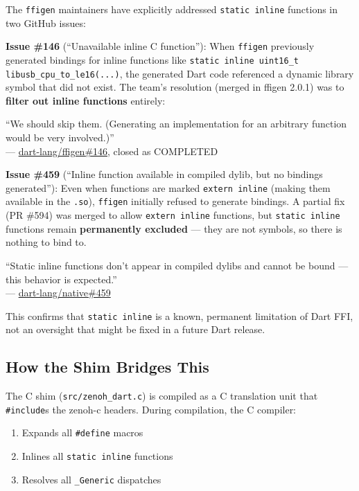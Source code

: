 \documentclass[11pt,a4paper]{article}
\newcommand{\code}[1]{\texttt{#1}}
\newcommand{\file}[1]{\texttt{#1}}
\begin{document}
The \code{ffigen} maintainers have explicitly addressed \code{static inline}
functions in two GitHub issues:

\textbf{Issue \#146} (``Unavailable inline C function''): When \code{ffigen}
previously generated bindings for inline functions like
\code{static inline uint16\_t libusb\_cpu\_to\_le16(...)}, the generated Dart
code referenced a dynamic library symbol that did not exist. The team's
resolution (merged in ffigen 2.0.1) was to \textbf{filter out inline functions}
entirely:

\begin{quotebox}
``We should skip them. (Generating an implementation for an arbitrary
function would be very involved.)''\\
--- \href{https://github.com/dart-lang/ffigen/issues/146}{dart-lang/ffigen\#146}, closed as COMPLETED
\end{quotebox}

\textbf{Issue \#459} (``Inline function available in compiled dylib, but no
bindings generated''): Even when functions are marked \code{extern inline}
(making them available in the \code{.so}), \code{ffigen} initially refused to
generate bindings. A partial fix (PR \#594) was merged to allow
\code{extern inline} functions, but \code{static inline} functions remain
\textbf{permanently excluded} --- they are not symbols, so there is nothing
to bind to.

\begin{quotebox}
``Static inline functions don't appear in compiled dylibs and cannot be
bound --- this behavior is expected.''\\
--- \href{https://github.com/dart-lang/native/issues/459}{dart-lang/native\#459}
\end{quotebox}

This confirms that \code{static inline} is a known, permanent limitation of
Dart FFI, not an oversight that might be fixed in a future Dart release.


\subsection{How the Shim Bridges This}

The C shim (\file{src/zenoh\_dart.c}) is compiled as a C translation unit
that \code{\#include}s the zenoh-c headers. During compilation, the C
compiler:

\begin{enumerate}
  \item Expands all \code{\#define} macros
  \item Inlines all \code{static inline} functions
  \item Resolves all \code{\_Generic} dispatches
\end{enumerate}
\end{document}
